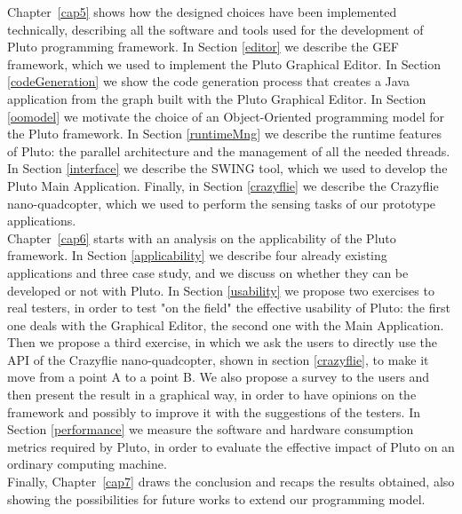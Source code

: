 Chapter~\ref{cap5} shows how the designed choices have been implemented technically, describing all the software and tools used for the development of Pluto programming framework.
In Section \ref{editor} we describe the GEF framework, which we used to implement the Pluto Graphical Editor.
In Section \ref{codeGeneration} we show the code generation process that creates a Java application from the graph built with the Pluto Graphical Editor.
In Section \ref{oomodel} we motivate the choice of an Object-Oriented programming model for the Pluto framework.
In Section \ref{runtimeMng} we describe the runtime features of Pluto:
the parallel architecture and the management of all the needed threads.
In Section \ref{interface} we describe the SWING tool, which we used to develop the Pluto Main Application.
Finally, in Section \ref{crazyflie} we describe the Crazyflie nano-quadcopter, which we used to perform the sensing tasks of our prototype applications.
\\

Chapter~\ref{cap6} starts with an analysis on the applicability of the Pluto framework.
In Section \ref{applicability} we describe four already existing applications and three case study, and we discuss on whether they can be developed or not with Pluto. 
In Section \ref{usability} we propose two exercises to real testers, in order to test "on the field" the effective usability of Pluto:
the first one deals with the Graphical Editor, the second one with the Main Application.
Then we propose a third exercise, in which we ask the users to directly use the API of the Crazyflie nano-quadcopter, shown in section \ref{crazyflie}, to make it move from a point A to a point B.
We also propose a survey to the users and then present the result in a graphical way, in order to have opinions on the framework and possibly to improve it with the suggestions of the testers.
In Section \ref{performance} we measure the software and hardware consumption metrics required by Pluto, in order to evaluate the effective impact of Pluto on an ordinary computing machine.
\\

Finally, Chapter~\ref{cap7} draws the conclusion and recaps the results obtained, also showing the possibilities for future works to extend our programming model.